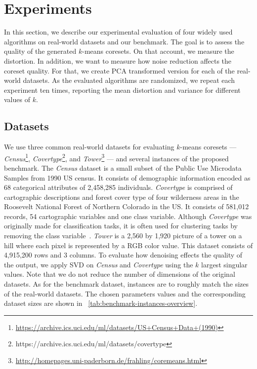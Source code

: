 \section{Experiments} \label{sec:experiments}
In this section, we describe our experimental evaluation of four widely used algorithms on real-world datasets and our benchmark. The goal is to assess the quality of the generated $k$-means coresets. On that account, we measure the distortion. In addition, we want to measure how noise reduction affects the coreset quality. For that, we create PCA transformed version for each of the real-world datasets. As the evaluated algorithms are randomized, we repeat each experiment ten times, reporting the mean distortion and variance for different values of $k$.


\subsection{Datasets}
We use three common real-world datasets for evaluating $k$-means coresets 
---
\textit{Census}\footnote{\url{https://archive.ics.uci.edu/ml/datasets/US+Census+Data+(1990)}},
\textit{Covertype}\footnote{https://archive.ics.uci.edu/ml/datasets/covertype}, and 
\textit{Tower}\footnote{\url{http://homepages.uni-paderborn.de/frahling/coremeans.html}}
---
and several instances of the proposed benchmark. 
The \textit{Census} dataset is a small subset of the Public Use Microdata Samples from 1990 US census. It consists of demographic information encoded as 68 categorical attributes of 2,458,285 individuals. \textit{Covertype} is comprised of cartographic descriptions and forest cover type of four wilderness areas in the Roosevelt National Forest of Northern Colorado in the US. It consists of 581,012 records, 54 cartographic variables and one class variable. Although \textit{Covertype} was originally made for classification tasks, it is often used for clustering tasks by removing the class variable~\cite{AckermannMRSLS12}. \textit{Tower} is a 2,560 by 1,920 picture of a tower on a hill where each pixel is represented by a RGB color value. This dataset consists of 4,915,200 rows and 3 columns. To evaluate how denoising effects the quality of the output, we apply SVD on \textit{Census} and \textit{Covertype} using the $k$ largest singular values. Note that we do not reduce the number of dimensions of the original datasets. As for the benchmark dataset, instances are to roughly match the sizes of the real-world datasets. The chosen parameters values and the corresponding dataset sizes are shown in ~\cref{tab:benchmark-instances-overview}. 




